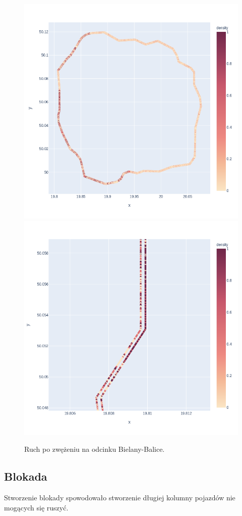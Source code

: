 \documentclass[a4paper,12pt]{article}
\begin{document}
    \begin{figure}[H]
    	\centering
    	\includegraphics[width=0.65\linewidth,height=0.3\textheight]{img/note-sim-restriction.png}
    	\includegraphics[width=0.34\linewidth,height=0.3\textheight]{img/note-sim-restriction-zoom.png}
    	\caption{Ruch po zwężeniu na odcinku Bielany-Balice.}
    \end{figure}
    
    \subsection{Blokada}
    Stworzenie blokady spowodowało stworzenie długiej kolumny pojazdów nie mogących się ruszyć.
    
\end{document}
